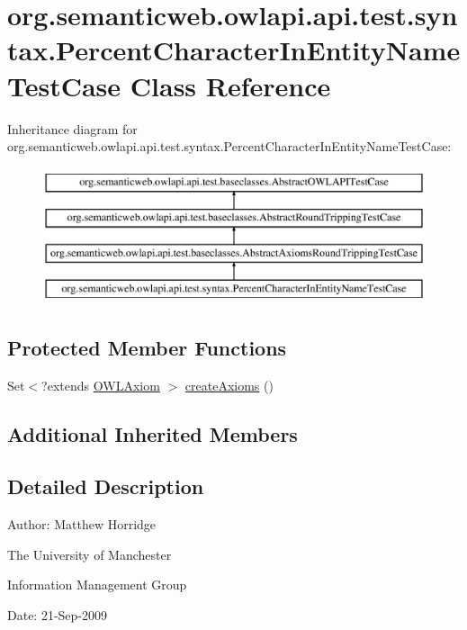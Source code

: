 \hypertarget{classorg_1_1semanticweb_1_1owlapi_1_1api_1_1test_1_1syntax_1_1_percent_character_in_entity_name_test_case}{\section{org.\-semanticweb.\-owlapi.\-api.\-test.\-syntax.\-Percent\-Character\-In\-Entity\-Name\-Test\-Case Class Reference}
\label{classorg_1_1semanticweb_1_1owlapi_1_1api_1_1test_1_1syntax_1_1_percent_character_in_entity_name_test_case}
}
Inheritance diagram for org.\-semanticweb.\-owlapi.\-api.\-test.\-syntax.\-Percent\-Character\-In\-Entity\-Name\-Test\-Case\-:\begin{figure}[H]
\begin{center}
\leavevmode
\includegraphics[height=4.000000cm]{classorg_1_1semanticweb_1_1owlapi_1_1api_1_1test_1_1syntax_1_1_percent_character_in_entity_name_test_case}
\end{center}
\end{figure}
\subsection*{Protected Member Functions}
\begin{DoxyCompactItemize}
\item 
Set$<$?extends \hyperlink{interfaceorg_1_1semanticweb_1_1owlapi_1_1model_1_1_o_w_l_axiom}{O\-W\-L\-Axiom} $>$ \hyperlink{classorg_1_1semanticweb_1_1owlapi_1_1api_1_1test_1_1syntax_1_1_percent_character_in_entity_name_test_case_a45e532916cbc4308cd27f3f3c7b59c7e}{create\-Axioms} ()
\end{DoxyCompactItemize}
\subsection*{Additional Inherited Members}


\subsection{Detailed Description}
Author\-: Matthew Horridge\par
 The University of Manchester\par
 Information Management Group\par
 Date\-: 21-\/\-Sep-\/2009 

